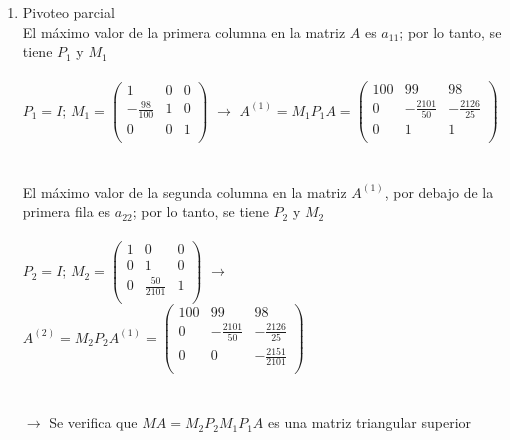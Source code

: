 \begin{enumerate}[]
    \begin{enumerate}[]
        \item Pivoteo parcial\\
        El máximo valor de la primera columna en la matriz $A$ es $a_{11}$; por lo tanto, se tiene $P_1$ y $M_1$\\
        \\
        $P_1 = I$; 
        $M_1 = \begin{pmatrix}
            1 & 0 & 0 \\ 
            -\frac{98}{100} & 1 & 0 \\
            0 & 0 & 1 \\
        \end{pmatrix} $ 
        $\xrightarrow{}$
        $A^{(1)}= M_1P_1A = \begin{pmatrix}
            100 & 99 & 98 \\ 
            0 & -\frac{2101}{50} & -\frac{2126}{25} \\
            0 & 1 & 1 \\
        \end{pmatrix}$
        \\\\\\
        El máximo valor de la segunda columna en la matriz $A^{(1)}$, por debajo de la primera fila es $a_{22}$; por lo tanto, se tiene $P_2$ y $M_2$\\\\
        $P_2 = I$; 
        $M_2 = \begin{pmatrix}
            1 & 0 & 0 \\ 
            0 & 1 & 0 \\
            0 & \frac{50}{2101} & 1 \\
        \end{pmatrix} $ 
        $\xrightarrow{}$
        $A^{(2)}= M_2P_2A^{(1)} = \begin{pmatrix}
             100 & 99 & 98 \\ 
            0 & -\frac{2101}{50} & -\frac{2126}{25} \\
            0 & 0 & -\frac{2151}{2101} \\
        \end{pmatrix}$
        \\\\\\
        $\xrightarrow{}$ Se verifica que $MA = M_2P_2M_1P_1A$ es una matriz triangular superior\\
        

\end{enumerate}
\end{enumerate}
